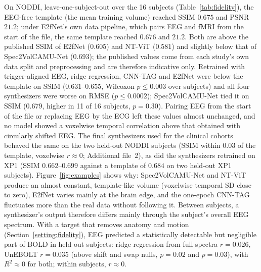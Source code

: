 On NODDI, leave-one-subject-out over the 16 subjects (Table~\ref{tab:fidelity}), the EEG-free template (the mean training volume) reached SSIM $0.675$ and PSNR $21.2$; under E2fNet's own data pipeline, which pairs EEG and fMRI from the start of the file, the same template reached $0.676$ and $21.2$. Both are above the published SSIM of E2fNet ($0.605$) and NT-ViT ($0.581$) and slightly below that of Spec2VolCAMU-Net ($0.693$); the published values come from each study's own data split and preprocessing and are therefore indicative only. Retrained with trigger-aligned EEG, ridge regression, CNN-TAG and E2fNet were below the template on SSIM ($0.631$--$0.655$, Wilcoxon $p\leq0.003$ over subjects) and all four synthesizers were worse on RMSE ($p\leq0.0002$); Spec2VolCAMU-Net tied it on SSIM ($0.679$, higher in 11 of 16 subjects, $p=0.30$). Pairing EEG from the start of the file or replacing EEG by the ECG left these values almost unchanged, and no model showed a voxelwise temporal correlation above that obtained with circularly shifted EEG. The final synthesizers used for the clinical cohorts behaved the same on the two held-out NODDI subjects (SSIM within $0.03$ of the template, voxelwise $r\approx0$; Additional file~2), as did the synthesizers retrained on XP1 (SSIM $0.662$--$0.699$ against a template of $0.684$ on two held-out XP1 subjects). Figure~\ref{fig:examples} shows why: Spec2VolCAMU-Net and NT-ViT produce an almost constant, template-like volume (voxelwise temporal SD close to zero), E2fNet varies mainly at the brain edge, and the one-epoch CNN-TAG fluctuates more than the real data without following it. Between subjects, a synthesizer's output therefore differs mainly through the subject's overall EEG spectrum. With a target that removes anatomy and motion (Section~\ref{setting:fidelity}), EEG predicted a statistically detectable but negligible part of BOLD in held-out subjects: ridge regression from full spectra $r=0.026$, UnEBOLT $r=0.035$ (above shift and swap nulls, $p=0.02$ and $p=0.03$), with $R^2\approx0$ for both; within subjects, $r\approx0$.

